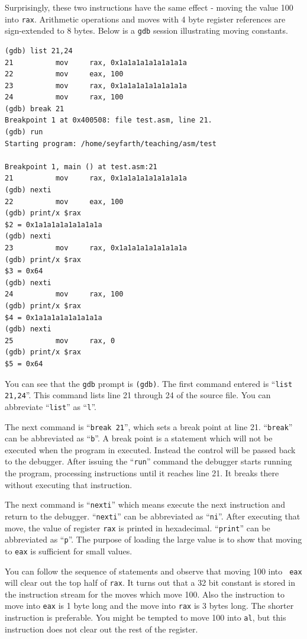 \documentclass[11pt,b5paper]{book}
\begin{document}
Surprisingly, these two instructions have the same effect - moving the value
100 into {\tt rax}.
Arithmetic operations and moves with 4 byte register references are sign-extended
to 8 bytes.
Below is a {\tt gdb} session illustrating moving constants. 
\begin{verbatim}
(gdb) list 21,24
21          mov     rax, 0x1a1a1a1a1a1a1a1a
22          mov     eax, 100
23          mov     rax, 0x1a1a1a1a1a1a1a1a
24          mov     rax, 100
(gdb) break 21
Breakpoint 1 at 0x400508: file test.asm, line 21.
(gdb) run
Starting program: /home/seyfarth/teaching/asm/test 

Breakpoint 1, main () at test.asm:21
21	        mov     rax, 0x1a1a1a1a1a1a1a1a
(gdb) nexti
22	        mov     eax, 100
(gdb) print/x $rax
$2 = 0x1a1a1a1a1a1a1a1a
(gdb) nexti
23	        mov     rax, 0x1a1a1a1a1a1a1a1a
(gdb) print/x $rax
$3 = 0x64
(gdb) nexti
24	        mov     rax, 100
(gdb) print/x $rax
$4 = 0x1a1a1a1a1a1a1a1a
(gdb) nexti
25	        mov     rax, 0
(gdb) print/x $rax
$5 = 0x64
\end{verbatim}

You can see that the {\tt gdb} prompt is {\tt (gdb)}.
The first command entered is ``{\tt list 21,24}''.   
This command lists line 21 through 24 of the source file.
You can abbreviate ``{\tt list}'' as ``{\tt l}''.

The next command is ``{\tt break 21}'', which sets a break point at line 21.
``{\tt break}'' can be abbreviated as ``{\tt b}''. 
A break point is a statement which will not be executed when the program in
executed.  Instead the control will be passed back to the debugger.
After issuing the ``{\tt run}'' command the debugger starts running the 
program, processing instructions until it reaches line 21.
It breaks there without executing that instruction.

The next command is ``{\tt nexti}'' which means execute the next instruction
and return to the debugger.     
``{\tt nexti}'' can be abbreviated as ``{\tt ni}''.
After executing that move, the value of register {\tt rax} is printed in
hexadecimal.
``{\tt print}'' can be abbreviated as ``{\tt p}''.  
The purpose of loading the large value is to show that moving to {\tt eax} is
sufficient for small values.

You can follow the sequence of statements and observe that moving 100 into {\tt
eax} will clear out the top half of {\tt rax}.
It turns out that a 32 bit constant is stored in the instruction stream for
the moves which move 100.
Also the instruction to move into {\tt eax} is 1 byte long and the move into
{\tt rax} is 3 bytes long.
The shorter instruction is preferable.
You might be tempted to move 100 into {\tt al}, but this instruction does not
clear out the rest of the register.
\end{document}
